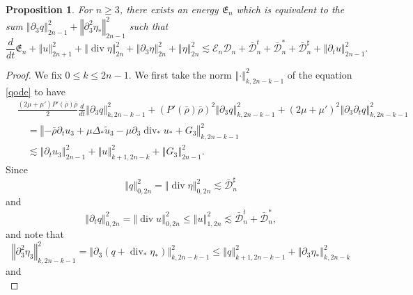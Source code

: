 \documentclass[a4paper,reqno,11pt]{amsart}
\numberwithin{equation}{section}
\providecommand{\norm}[1]{\left\Vert#1\right\Vert}
\providecommand{\sd}[1]{\mathcal{D}_{#1}}
\providecommand{\se}[1]{\mathcal{E}_{#1}}
\providecommand{\norm}[1]{\left\Vert#1\right\Vert}
\newtheorem{prop}[lem]{Proposition}
\begin{document}
\begin{prop}\label{qqestprop}
For $n\ge 3$, there exists an energy $\mathfrak{E}_n$ which is equivalent to the sum $ \norm{ {\partial}_3    {q} }_{2n-1}^2+ \norm{  {\partial}_3^2   \eta_\ast }_{2n-1}^2$ such that
 \begin{equation}\label{qqest}
 { \frac{d}{dt}}\mathfrak{E}_n  +  \norm{   u  }_{2n+1}^2+ \norm{ \operatorname{div} \eta }_{2n}^2
+ \norm{  {\partial}_3   \eta  }_{2n}^2+ \norm{     \eta  }_{2n}^2
 {\lesssim} { \se{n}  }\sd{n}
+\bar{\mathcal{D}}_n^t+\bar{\mathcal{D}}_n^\ast+\bar{\mathcal{D}}_n^\sharp+\norm{{\partial}_t  u  }_{2n-1}^2.
\end{equation}
\end{prop}
\begin{proof}
We fix $0\le k\le 2n-1$. We first take the norm $\norm{\cdot}_{k,2n-k-1}^2$ of the equation \eqref{qode} to have
\begin{equation}\label{q1}
\begin{split}
&\frac{(2\mu+\mu') P '(\bar{\rho} )\bar\rho}{2}  { \frac{d}{dt}} \norm{ {\partial}_3    {q} }_{k,2n-k-1}^2  +(P '(\bar{\rho} )\bar\rho)^2 \norm{ {\partial}_3   {q} }_{k,2n-k-1}^2
 +(2\mu+\mu')^2 \norm{ {\partial}_3  {\partial_t}  {q} }_{k,2n-k-1}^2
\\&\quad =\norm{- \bar \rho\partial_t u_3 +\mu\Delta_\ast \tilde{u}_3-\mu{\partial}_3\operatorname{div}_\ast u_\ast+G_3}_{k,2n-k-1}^2
\\&\quad{\lesssim}   \norm{{\partial}_t  u_3 }_{2n-1}^2
+  \norm{    u }_{k+1,2n-k}^2+\norm{G_3}_{2n-1}^2 .
\end{split}
\end{equation}
Since
\begin{equation}\label{q11}
 \norm{   q}_{ 0,2n}^2 = \norm{\operatorname{div} \eta}_{ 0,2n}^2 {\lesssim} \bar{\mathcal{D}}_n^\sharp
\end{equation}
and
\begin{equation}\label{q12}
 \norm{{\partial_t} q}_{ 0,2n}^2 = \norm{\operatorname{div} u}_{ 0,2n}^2 \le \norm{   u}_{1,2n}^2{\lesssim} \bar{\mathcal{D}}_n^t+ \bar{\mathcal{D}}_n^\ast,
\end{equation}
and note that
 \begin{equation}
 \norm{{\partial}_3^2 \eta_3  }_{k,2n-k-1}^2 = \norm{{\partial}_3 (q+ \operatorname{div}_\ast \eta_\ast ) }_{k,2n-k-1}^2 \le \norm{ q}_{k+1,2n-k-1}^2 + \norm{{\partial}_3   \eta_\ast }_{k,2n-k}^2
\end{equation}
and
 \begin{equation}

\end{equation}
\end{proof}
\end{document}
